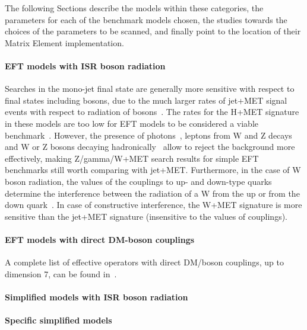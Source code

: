 The following Sections describe the models within these categories, 
the parameters for each of the benchmark models chosen,
the studies towards the choices of the parameters to be scanned, 
and finally point to the location of their Matrix Element 
implementation. 

\paragraph{EFT models with ISR boson radiation}

Searches in the mono-jet final state are generally more sensitive with respect to final
states including bosons, due to the much larger rates of jet+MET signal events with 
respect to radiation of bosons~\citep{Zhou:2013fla}.
The rates for the H+MET signature in these models are too low for EFT models 
to be considered a viable benchmark~\citep{Carpenter:2013xra}.
However, the presence of photons~\citep{Khachatryan:2014rwa, Aad:2014vka}, 
leptons from W and Z decays~\citep{Khachatryan:2014tva, Aad:2014vka, ATLAS:2014wra} 
and W or Z bosons decaying hadronically~\citep{Aad:2013oja}
allow to reject the background more effectively, making Z/gamma/W+MET search results for 
simple EFT benchmarks still worth comparing with jet+MET.
Furthermore, in the case of W boson radiation, the values of the 
couplings to up- and down-type quarks determine the interference between
the radiation of a W from the up or from the down quark~\citep{Bai:2012xg}. 
In case of constructive interference, the W+MET signature is more sensitive
than the jet+MET signature (insensitive to the values of couplings). 

\paragraph{EFT models with direct DM-boson couplings}

A complete list of effective operators with direct DM/boson couplings, 
up to dimension 7, can be found in~\citep{Cotta:2012nj}.

\paragraph{Simplified models with ISR boson radiation}

\paragraph{Specific simplified models}
